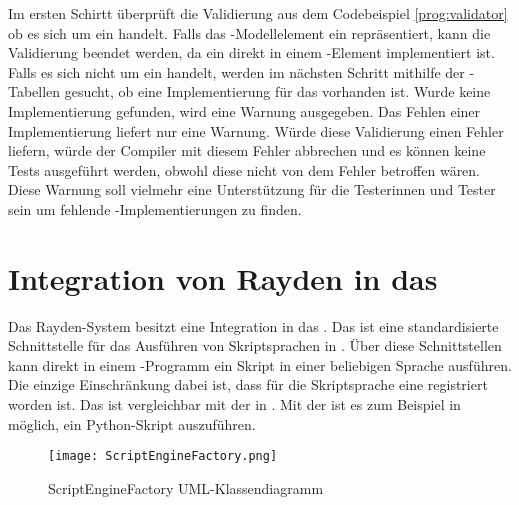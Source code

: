 \SuperPar
Im ersten Schirtt überprüft die Validierung aus dem Codebeispiel \ref{prog:validator} ob es sich um ein  handelt. Falls das -Modellelement ein  repräsentiert, kann die Validierung beendet werden, da ein  direkt in einem -Element implementiert ist. Falls es sich nicht um ein  handelt, werden im nächsten Schritt mithilfe der -Tabellen gesucht, ob eine Implementierung für das  vorhanden ist. Wurde keine Implementierung gefunden, wird eine Warnung ausgegeben. Das Fehlen einer Implementierung liefert nur eine Warnung. Würde diese Validierung einen Fehler liefern, würde der Compiler mit diesem Fehler abbrechen und es können keine Tests ausgeführt werden, obwohl diese nicht von dem Fehler betroffen wären. Diese Warnung soll vielmehr eine Unterstützung für die Testerinnen und Tester sein um fehlende -Implementierungen zu finden.


\section{Integration von Rayden in das }
\label{cha:implementJSA}

Das Rayden-System besitzt eine Integration in das . Das  ist eine standardisierte Schnittstelle für das Ausführen von Skriptsprachen in . Über diese Schnittstellen kann direkt in einem -Programm ein Skript in einer beliebigen Sprache ausführen. Die einzige Einschränkung dabei ist, dass für die Skriptsprache eine  registriert worden ist. Das  ist vergleichbar mit der  \cite{DLR} in . Mit der  ist es zum Beispiel in  möglich, ein Python-Skript \cite{Python} auszuführen.

\begin{figure}
\centering
\texttt{[image: ScriptEngineFactory.png]}
\caption{ScriptEngineFactory UML-Klassendiagramm}
\label{fig:scriptEngineFactoryUml}
\end{figure}

\begin{program}

\caption{Codeauszug aus der }
\label{prog:scriptEngine}
\end{program}

